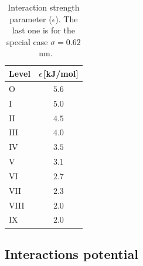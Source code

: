 \begin{table}\footnotesize
	\begin{tabular}{lc}
		\toprule
		Level  & $\epsilon$\,[kJ/mol] \\ \midrule
		O	   & $5.6$	 \\ \midrule
		I      & $5.0$	 \\ \midrule
		II	   & $4.5$	 \\ \midrule
		III	   & $4.0$	 \\ \midrule
		IV	   & $3.5$	 \\ \midrule
		V	   & $3.1$	 \\ \midrule
		VI	   & $2.7$	 \\ \midrule
		VII	   & $2.3$	 \\ \midrule
		VIII   & $2.0$	 \\ \midrule
		IX     & $2.0$	 \\ \bottomrule
	\end{tabular}
	\caption{Interaction strength parameter ($\epsilon$). The last one is for the special case $\sigma=0.62$~nm.}
	\label{tab:martiniEpsilon}
\end{table}

\subsection{Interactions potential}
